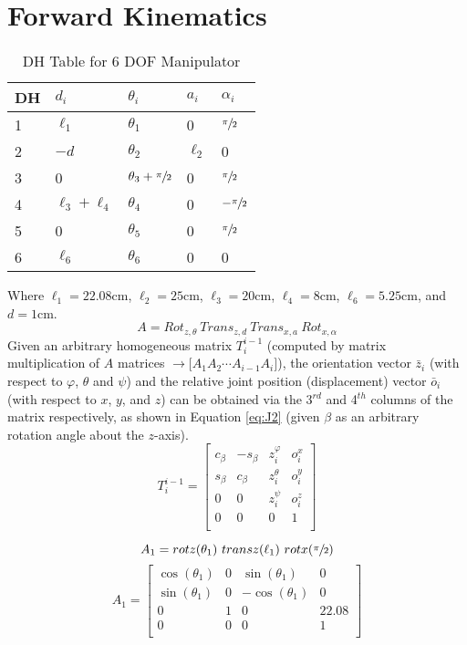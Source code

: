 \documentclass[12pt]{report}
\begin{document}
\section{Forward Kinematics}
\begin{table}[htp]
  \center
  \caption{DH Table for 6 DOF Manipulator}
  \label{table:dh}
  \begin{tabular}{C{1cm}|C{1.5cm}|C{2cm}|C{1cm}|C{1cm}}
    DH & $d_i$ & $\theta_i$ & $a_i$ & $\alpha_i$ \\  & $\ell_1$ & $\theta_1$ & 0 & $\sfrac{\pi}{2}$ \\
    2 & $-d$ & $\theta_2$ & $\ell_2$ & 0 \\
    3 & 0 & $\theta_3 + \sfrac{\pi}{2}$ & 0 & $\sfrac{\pi}{2}$ \\
    4 & $\ell_3 + \ell_4$ & $\theta_4$ & 0 & $-\sfrac{\pi}{2}$ \\
    5 & 0 & $\theta_5$ & 0 & $\sfrac{\pi}{2}$ \\
    6 & $\ell_6$ & $\theta_6$ & 0 & 0 \\
  \end{tabular}
\end{table}
Where \(\ell_1 = 22.08\)cm, \(\ell_2 = 25\)cm, \(\ell_3 = 20\)cm, \(\ell_4 = 8\)cm, \(\ell_6 = 5.25\)cm, and \(d = 1\)cm.
\begin{equation}
A = Rot_{z,\theta}~Trans_{z,d}~Trans_{x,a}~Rot_{x,\alpha}
\label{eq:J1}
\end{equation}%
Given an arbitrary homogeneous matrix $T_i^{i-1}$ (computed by matrix multiplication of $A$ matrices $\rightarrow \big[A_1A_2\cdots A_{i-1}A_i\big]$), the orientation vector $\bar{z}_i$ (with respect to $\varphi$, $\theta$ and $\psi$) and the relative joint position (displacement) vector $\bar{o}_i$ (with respect to $x$, $y$, and $z$) can be obtained via the 3$^{rd}$ and 4$^{th}$ columns of the matrix respectively,
as shown in Equation \ref{eq:J2} (given $\beta$ as an arbitrary rotation angle about the $z$-axis).
\begin{equation}
  T_i^{i-1} =
\begin{bmatrix}
  c_{\beta} & -s_{\beta} & z_i^{\varphi} & o_i^x \\
  s_{\beta} & c_{\beta} & z_i^{\theta} & o_i^y \\
  0 & 0 & z_i^{\psi} & o_i^z \\
  0 & 0 & 0 & 1 \\
\end{bmatrix}
\label{eq:J2}
\end{equation}
\begin{minipage}[b]{.5\textwidth}
  \strut\vspace*{-\baselineskip}\newline
\[
A_1 = rotz(\theta_1) ~ transz(\ell_1) ~ rotx(\sfrac{\pi}{2})
\]
\vspace{.25ex}
\[
A_1 =
\begin{bmatrix}
  \cos(\theta_1) & 0 & \sin(\theta_1) & 0 \\
  \sin(\theta_1) & 0 & -\cos(\theta_1) & 0 \\
  0 & 1 & 0 & 22.08 \\
  0 & 0 & 0 & 1 \\
\end{bmatrix}
\]
\end{minipage}%
\end{document}
